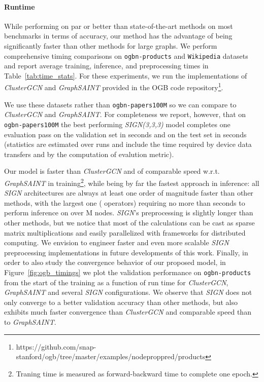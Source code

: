 \documentclass{article}
\begin{document}
\paragraph{Runtime}
While performing on par or better than state-of-the-art methods on most benchmarks in terms of accuracy, our method has the advantage of being significantly faster than other methods for large graphs. 
We perform comprehensive timing comparisons on \texttt{ogbn-products} and \texttt{Wikipedia} datasets and report average training, inference, and preprocessing times in Table~\ref{tab:time_stats}. For these experiments, we run the implementations of \textit{ClusterGCN} and \textit{GraphSAINT} provided in the OGB code repository\footnote{https://github.com/snap-stanford/ogb/tree/master/examples/nodeproppred/products}. 

We use these datasets rather than \texttt{ogbn-papers100M} so we can compare to \textit{ClusterGCN} and \textit{GraphSAINT}. For completeness we report, however, that on \texttt{ogbn-papers100M} the best performing \textit{SIGN(3,3,3)} model completes one evaluation pass on the validation set in  seconds and on the test set in  seconds (statistics are estimated over  runs and include the time required by device data transfers and by the computation of evalution metric).

Our model is faster than \textit{ClusterGCN} and of comparable speed w.r.t. \textit{GraphSAINT} in training\footnote{Traning time is measured as forward-backward time to complete one epoch.}, while being by far the fastest approach in inference: all \textit{SIGN} architectures are always at least one order of magnitude faster than other methods, with the largest one ( operators) requiring no more than  seconds to perform inference on over M nodes.
\textit{SIGN}'s preprocessing is slightly longer than other methods, but we notice that most of the calculations can be cast as sparse matrix multiplications and easily parallelized with frameworks for distributed computing. We envision to engineer faster and even more scalable \textit{SIGN} preprocessing implementations in future developments of this work.
Finally, in order to also study the convergence behavior of our proposed model, in Figure~\ref{fig:ogb_timings} we plot the validation performance on \texttt{ogbn-products} from the start of the training as a function of run time for \textit{ClusterGCN}, \textit{GraphSAINT} and several \textit{SIGN} configurations. We observe that \textit{SIGN} does not only converge to a better validation accuracy than other methods, but also exhibits much faster convergence than \textit{ClusterGCN} and comparable speed than to \textit{GraphSAINT}.
\end{document}
